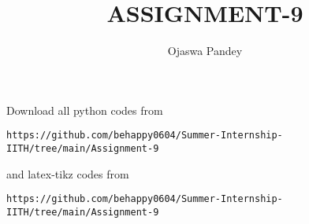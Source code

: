 \documentclass[journal,12pt,twocolumn]{IEEEtran}
\begin{document}
     \def\topbox#1{\raisebox{-\baselineskip}[0in][0in]{#1}}
     \def\midbox#1{\raisebox{-0.5\baselineskip}[0in][0in]{#1}}
\vspace{3cm}
\title{ASSIGNMENT-9}
\author{Ojaswa Pandey}
\maketitle
\newpage
\bigskip
\renewcommand{\thefigure}{\theenumi}
\renewcommand{\thetable}{\theenumi}
Download all python codes from 
\begin{lstlisting}
https://github.com/behappy0604/Summer-Internship-IITH/tree/main/Assignment-9
\end{lstlisting}
%
and latex-tikz codes from 
%
\begin{lstlisting}
https://github.com/behappy0604/Summer-Internship-IITH/tree/main/Assignment-9
\end{lstlisting}
%
\end{document}
